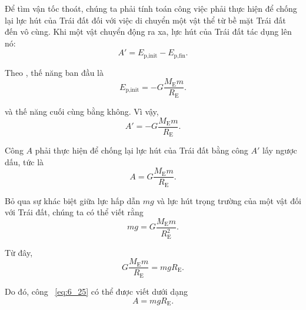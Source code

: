 Để tìm vận tốc thoát, chúng ta phải tính toán công việc phải thực hiện để chống lại lực hút của Trái đất đối với việc di chuyển một vật thể từ bề mặt Trái đất đến vô cùng. Khi một vật chuyển động ra xa, lực hút của Trái đất tác dụng lên nó:
\begin{equation*}
	A' = E_{\text{p,init}} - E_{\text{p,fin}}.
\end{equation*}

\noindent
Theo , thế năng ban đầu là
\begin{equation*}
	E_{\text{p,init}} = -G\frac{M_{\text{E}}m}{R_{\text{E}}}.
\end{equation*}

\noindent
và thế năng cuối cùng bằng không. Vì vậy,
\begin{equation*}
	A' = -G\frac{M_{\text{E}}m}{R_{\text{E}}}.
\end{equation*}

\noindent
Công $A$ phải thực hiện để chống lại lực hút của Trái đất bằng công $A'$ lấy ngược dấu, tức là
\begin{equation}\label{eq:6_25}
	A = G\frac{M_{\text{E}}m}{R_{\text{E}}}.
\end{equation}

Bỏ qua sự khác biệt giữa lực hấp dẫn $mg$ và lực hút trọng trường của một vật đối với Trái đất, chúng ta có thể viết rằng
\begin{equation*}
	mg = G\frac{M_{\text{E}}m}{R_{\text{E}}^2}.
\end{equation*}

\noindent
Từ đây,
\begin{equation*}
	G\frac{M_{\text{E}}m}{R_{\text{E}}} = mgR_{\text{E}}.
\end{equation*}

\noindent
Do đó, công ~\eqref{eq:6_25} có thể được viết dưới dạng
\begin{equation}\label{eq:6_26}
	A = mgR_{\text{E}}.
\end{equation}

